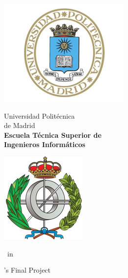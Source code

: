 \begin{titlepage}

\begin{minipage}{0.15\linewidth}
\hspace*{-15mm}
\noindent
\includegraphics[scale=0.5]{portada/escudo_upm.png}
\end{minipage}
\begin{minipage}{0.7\linewidth}
\begin{center}
\huge{ Universidad Politécnica\\de Madrid }\\
\vspace*{0.5cm}
\Large{\textbf{Escuela Técnica Superior de \\
Ingenieros Informáticos}}
\end{center}
\end{minipage}
\begin{minipage}{0.2\linewidth}
\includegraphics[scale=0.5]{portada/escudo_etsiinf.png}
\end{minipage}

\vspace*{1cm}
\begin{center}
\Large{\Studies\ in \StudiesTitle}
\end{center}

\vspace*{1cm}
\begin{center}
\huge{\Studies 's Final Project}
\end{center}

\vspace*{0.5cm}
\begin{center}
\huge\bfseries {\ThesisTitle}
\end{center}


\end{titlepage}

